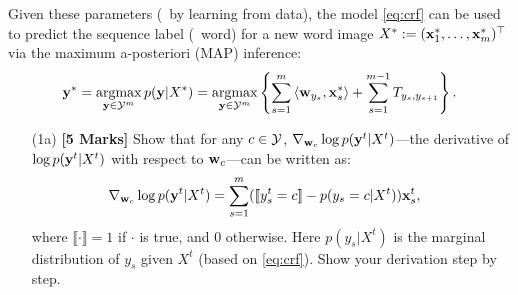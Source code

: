 \documentclass[11pt]{report}
\begin{document}
Given these parameters (\eg\ by learning from data), the model \eqref{eq:crf} can be used to predict the sequence label (\ie\ word) for a new word image $X^* := (\mathbf{\boldsymbol{x}}^*_1, \ldots, \mathbf{\boldsymbol{x}}^*_m)^\top$ via the maximum a-posteriori (MAP) inference:
\begin{align}
	\label{eq:crf_decode}
	\mathbf{\boldsymbol{y}}^* = \operatorname*{\mathrm{argmax}}_{\mathbf{\boldsymbol{y}} \in \mathcal{Y}^m} p(\mathbf{\boldsymbol{y}} | X^*)
	= \operatorname*{\mathrm{argmax}}_{\mathbf{\boldsymbol{y}} \in \mathcal{Y}^m} \left\{ \sum_{s=1}^m \left\langle \mathbf{\boldsymbol{w}}_{y_s},\mathbf{\boldsymbol{x}}^*_s \right\rangle + \sum_{s=1}^{m-1} T_{y_s, y_{s+1}}\right\}.
\end{align}




\begin{itemize}
	\item[(1a)] {\bf [5 Marks]} Show that for any $c \in \mathcal{Y}$, 
	${\nabla}_{\mathbf{\boldsymbol{w}}_c} \log p(\mathbf{\boldsymbol{y}}^t|X^t)$---the derivative of $\log p(\mathbf{\boldsymbol{y}}^t|X^t)$ with respect to $\mathbf{\boldsymbol{w}}_c$---can be written as:
	\begin{align}
		{\nabla}_{\mathbf{\boldsymbol{w}}_c} \log p(\mathbf{\boldsymbol{y}}^t|X^t) & = \sum_{s=1}^m ([\![y^t_s = c]\!] - p(y_s = c | X^t)) \mathbf{\boldsymbol{x}}^t_s,
	\end{align}
	where $\llbracket \cdot \rrbracket = 1$ if $\cdot$ is true, and 0 otherwise.
	Here $p(y_s | X^t)$ is the marginal distribution of $y_s$ given $X^t$ (based on \eqref{eq:crf}).
	Show your derivation step by step.
	

\end{itemize}
\end{document}
